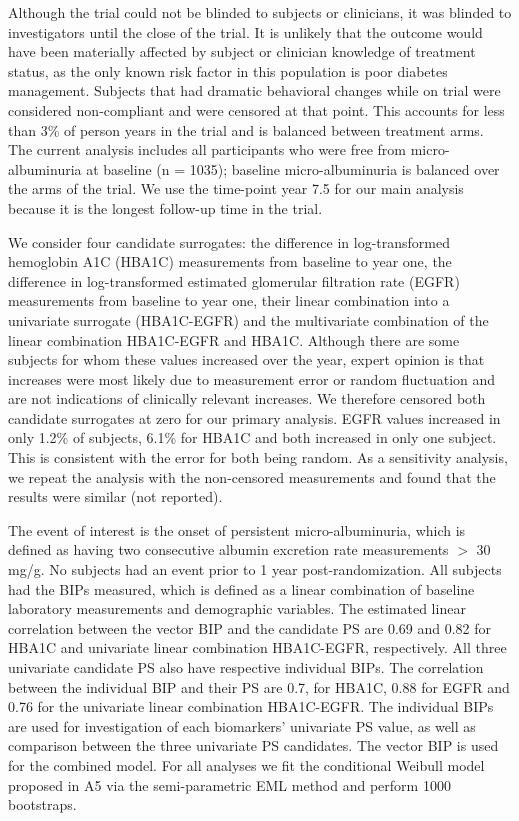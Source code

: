 \documentclass[times, doublespace]{simauth}
\begin{document}
Although the trial could not be blinded to subjects or clinicians, it was blinded to investigators until the close of the trial. It is unlikely that the outcome would have been materially affected by subject or clinician knowledge of treatment status, as the only known risk factor in this population is poor diabetes management. Subjects that had dramatic behavioral changes while on trial were considered non-compliant and were censored at that point. This accounts for less than 3\% of person years in the trial and is balanced between treatment arms. The current analysis includes all participants who were free from micro-albuminuria at baseline (n = 1035); baseline micro-albuminuria is balanced over the arms of the trial. We use the time-point year 7.5 for our main analysis because it is the longest follow-up time in the trial.

We consider four candidate surrogates: the difference in log-transformed hemoglobin A1C (HBA1C) measurements from baseline to year one, the difference in log-transformed estimated glomerular filtration rate (EGFR) measurements from baseline to year one, their linear combination into a univariate surrogate (HBA1C-EGFR) and the multivariate combination of the linear combination HBA1C-EGFR and HBA1C. Although there are some subjects for whom these values increased over the year, expert opinion is that increases were most likely due to measurement error or random fluctuation and are not indications of clinically relevant increases. We therefore censored both candidate surrogates at zero for our primary analysis. EGFR values increased in only 1.2\% of subjects, 6.1\% for HBA1C and both increased in only one subject. This is consistent with the error for both being random. As a sensitivity analysis, we repeat the analysis with the non-censored measurements and found that the results were similar (not reported). 

The event of interest is the onset of persistent micro-albuminuria, which is defined as having two consecutive albumin excretion rate measurements $>$ 30 mg/g. No subjects had an event prior to 1 year post-randomization. All subjects had the BIPs measured, which is defined as a linear combination of baseline laboratory measurements and demographic variables. The estimated linear correlation between the vector BIP and the candidate PS are 0.69 and 0.82 for HBA1C and univariate linear combination HBA1C-EGFR, respectively. All three univariate candidate PS also have respective individual BIPs. The correlation between the individual BIP and their PS are 0.7, for HBA1C, 0.88 for EGFR and 0.76 for the univariate linear combination HBA1C-EGFR. The individual BIPs are used for investigation of each biomarkers' univariate PS value, as well as comparison between the three univariate PS candidates. The vector BIP is used for the combined model. For all analyses we fit the conditional Weibull model proposed in A5 via the semi-parametric EML method and perform 1000 bootstraps. 
\end{document}
